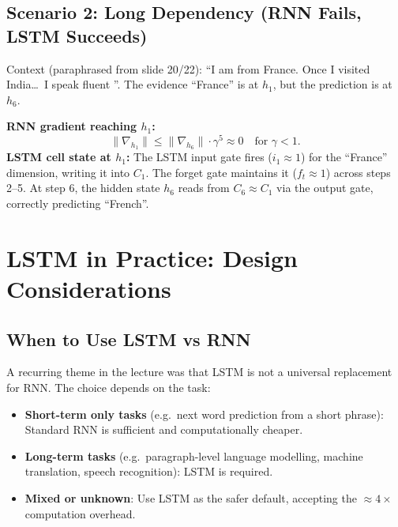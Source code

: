 \documentclass[12pt,a4paper]{article}
\begin{document}
\subsection{Scenario 2: Long Dependency (RNN Fails, LSTM Succeeds)}
\label{subsec:scenario2}

\begin{example}[title=``I am from France \ldots\ I speak fluent \underline{\hspace{1.5em}}'']
  Context (paraphrased from slide 20/22): ``I am from France. Once I visited
  India\ldots\ I speak fluent \underline{\hspace{1em}}''. The evidence
  ``France'' is at $h_1$, but the prediction is at $h_6$. \medskip

  \noindent\textbf{RNN gradient reaching $h_1$:}
  \[
    \|\nabla_{h_1}\| \leq \|\nabla_{h_6}\| \cdot \gamma^5
    \approx 0 \quad \text{for } \gamma < 1.
  \]
  \textbf{LSTM cell state at $h_1$:} The LSTM input gate fires
  ($i_1 \approx 1$) for the ``France'' dimension, writing it into $C_1$.
  The forget gate maintains it ($f_t \approx 1$) across steps 2--5. At
  step 6, the hidden state $h_6$ reads from $C_6 \approx C_1$ via the
  output gate, correctly predicting ``French''.
\end{example}

\section{LSTM in Practice: Design Considerations}
\label{sec:practice}

\subsection{When to Use LSTM vs RNN}
\label{subsec:when-to-use}

A recurring theme in the lecture was that LSTM is not a universal
replacement for RNN. The choice depends on the task:

\begin{itemize}
  \item \textbf{Short-term only tasks} (e.g.\ next word prediction from a
        short phrase): Standard RNN is sufficient and computationally
        cheaper.
  \item \textbf{Long-term tasks} (e.g.\ paragraph-level language modelling,
        machine translation, speech recognition): LSTM is required.
  \item \textbf{Mixed or unknown}: Use LSTM as the safer default, accepting
        the $\approx 4\times$ computation overhead.
\end{itemize}
\end{document}
